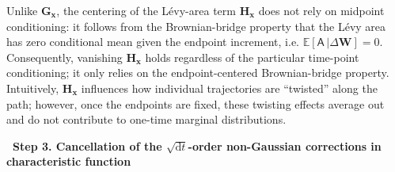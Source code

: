 \documentclass[
 longbibliography,
 twocolumn,
 superscriptaddress,
 amsmath,
 amssymb,
 amsthm,
 amsfonts,
 prl,
 floatfix,
]{revtex4-2}
\newcommand{\matbf}[1]{\boldsymbol{\mathsf{#1}}}
\begin{document}
\begin{widetext}
Unlike $\bm{G}_{\bm x}$, the centering of the L\'evy-area term $\bm{H}_{\bm x}$ does not rely on midpoint conditioning: it follows from the Brownian-bridge property that the L\'evy area has zero conditional mean given the endpoint increment, i.e. $\mathbb{E}[\matbf{A}\,\vert\Delta\bm{W}]=0$. Consequently, vanishing $\bm{H}_{\bm{x}}$ holds regardless of the particular time-point conditioning; it only relies on the endpoint-centered Brownian-bridge property.
Intuitively, $\bm{H}_{\bm{x}}$ influences how individual trajectories are ``twisted'' along the path; however, once the endpoints are fixed, these twisting effects average out and do not contribute to one-time marginal distributions.

\bigskip
\noindent\textbf{\textbullet\ Step 3. Cancellation of the $\sqrt{\mathrm{d}t}$-order non-Gaussian corrections in characteristic function} 


\end{widetext}
\end{document}
